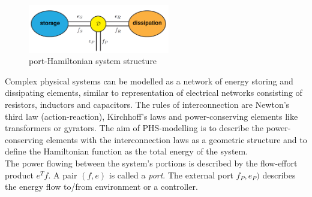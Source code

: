 \documentclass[a4paper,twoside, openright,12pt]{report}
\begin{document}
\begin{figure}[htb]
	\centering
	\includegraphics[width=0.55\textwidth]{diracstructure.png}
	\caption[port-Hamiltonian system structure]{port-Hamiltonian system structure \cite{vanderSchaft_06}}
	\label{FIG:pHsstructure}
\end{figure}

Complex physical systems can be modelled as a network of energy storing and dissipating elements, similar to representation of electrical networks consisting of resistors, inductors and capacitors. The rules of interconnection are Newton's third law (action-reaction), Kirchhoff's laws and power-conserving elements like transformers or gyrators. The aim of PHS-modelling is to describe the power-conserving elements with the interconnection laws as a geometric structure and to define the Hamiltonian function as the total energy of the system. \\
The power flowing between the system's portions is described by the flow-effort product $e^Tf$. A pair $(f,e)$ is called a \emph{port}. The external port $f_P,e_P)$ describes the energy flow to/from environment or a controller. 
\end{document}
